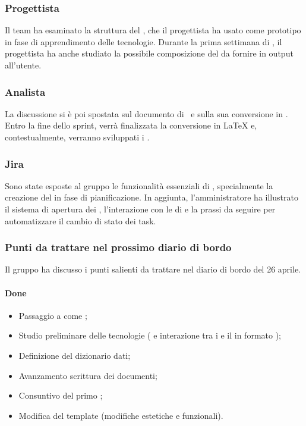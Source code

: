 \subsubsection{Progettista}
\par Il team ha esaminato la struttura del , che il progettista ha usato come prototipo in fase di apprendimento delle tecnologie. Durante la prima settimana di , il progettista ha anche studiato la possibile composizione del  da fornire in output all'utente.

\subsubsection{Analista}
\par La discussione si è poi spostata sul documento di \AdR\ e sulla sua conversione in . Entro la fine dello sprint, verrà finalizzata la conversione in LaTeX e, contestualmente, verranno sviluppati i .

\subsubsection{Jira}
\par Sono state esposte al gruppo le funzionalità essenziali di , specialmente la creazione del  in fase di pianificazione. In aggiunta, l'amministratore ha illustrato il sistema di apertura dei , l'interazione con le  di  e la prassi da seguire per automatizzare il cambio di stato dei task.

\subsubsection{Punti da trattare nel prossimo diario di bordo}
\par Il gruppo ha discusso i punti salienti da trattare nel diario di bordo del 26 aprile.

\paragraph{Done}
\begin{itemize}
	\item Passaggio a  come ;
	\item Studio preliminare delle tecnologie ( e interazione tra i  e il  in formato );
	\item Definizione del dizionario dati;
	\item Avanzamento scrittura dei documenti;
	\item Consuntivo del primo ;
	\item Modifica del template  (modifiche estetiche e funzionali).
\end{itemize}

